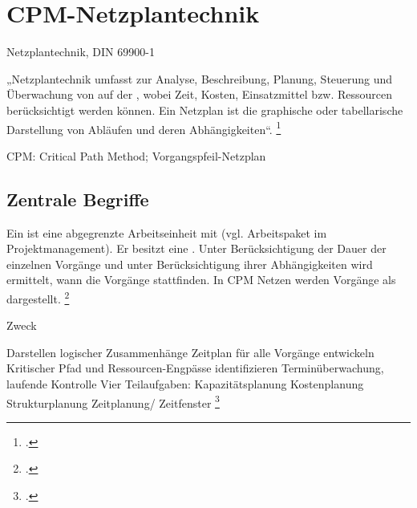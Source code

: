 \documentclass{lehramt-informatik}
\begin{document}

\chapter{CPM-Netzplantechnik}

\begin{quellen}
\item \cite{wiki:netzplantechnik}
\item \cite{wiki:methode-kritischer-pfad}
\end{quellen}

Netzplantechnik, DIN 69900-1

„Netzplantechnik umfasst  zur Analyse,
Beschreibung, Planung, Steuerung und Überwachung von 
auf der , wobei Zeit, Kosten,
Einsatzmittel bzw. Ressourcen berücksichtigt werden können. Ein Netzplan
ist die graphische oder tabellarische Darstellung von Abläufen und deren
Abhängigkeiten“.
\footcite[Seite 14]{sosy:fs:3}

CPM: Critical Path Method; Vorgangspfeil-Netzplan

%

\section{Zentrale Begriffe}

Ein  ist eine abgegrenzte Arbeitseinheit mit
 (vgl. Arbeitspaket im Projektmanagement).
Er besitzt eine .
%
Unter Berücksichtigung der Dauer der einzelnen Vorgänge und unter
Berücksichtigung ihrer Abhängigkeiten wird ermittelt, wann die Vorgänge
stattfinden.
%
In CPM Netzen werden Vorgänge als 
dargestellt.
\footcite[Seite 15]{sosy:fs:3}

Zweck

Darstellen logischer Zusammenhänge
Zeitplan für alle Vorgänge entwickeln
Kritischer Pfad und Ressourcen-Engpässe identifizieren
Terminüberwachung, laufende Kontrolle
Vier Teilaufgaben:
Kapazitätsplanung
Kostenplanung
Strukturplanung
Zeitplanung/ Zeitfenster
\footcite[Seite 22]{sosy:fs:3}
\end{document}
